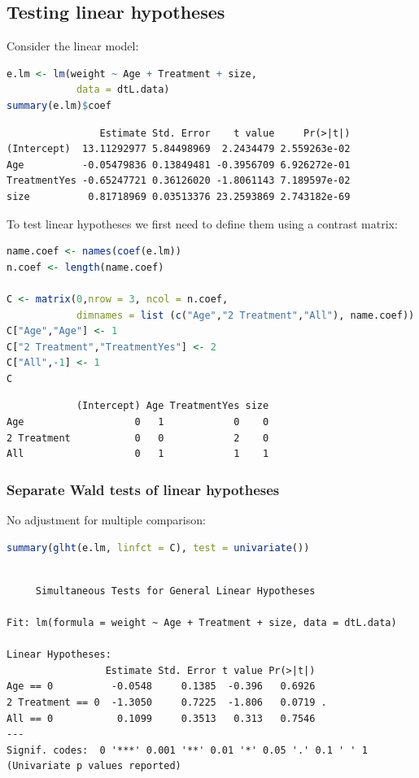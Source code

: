 \documentclass{article}
\begin{document}
\subsection{Testing linear hypotheses}
\label{sec:org1c1d007}

Consider the linear model:
\begin{lstlisting}[language=r,numbers=none]
e.lm <- lm(weight ~ Age + Treatment + size,
            data = dtL.data)
summary(e.lm)$coef
\end{lstlisting}

\label{}
\begin{verbatim}
                Estimate Std. Error    t value     Pr(>|t|)
(Intercept)  13.11292977 5.84498969  2.2434479 2.559263e-02
Age          -0.05479836 0.13849481 -0.3956709 6.926272e-01
TreatmentYes -0.65247721 0.36126020 -1.8061143 7.189597e-02
size          0.81718969 0.03513376 23.2593869 2.743182e-69
\end{verbatim}


To test linear hypotheses we first need to define them using a contrast matrix:
\begin{lstlisting}[language=r,numbers=none]
name.coef <- names(coef(e.lm))
n.coef <- length(name.coef)

C <- matrix(0,nrow = 3, ncol = n.coef, 
            dimnames = list (c("Age","2 Treatment","All"), name.coef))
C["Age","Age"] <- 1
C["2 Treatment","TreatmentYes"] <- 2
C["All",-1] <- 1
C
\end{lstlisting}

\label{}
\begin{verbatim}
            (Intercept) Age TreatmentYes size
Age                   0   1            0    0
2 Treatment           0   0            2    0
All                   0   1            1    1
\end{verbatim}
\subsubsection{Separate Wald tests of linear hypotheses}
\label{sec:orgf19e1c3}

No adjustment for multiple comparison:
\begin{lstlisting}[language=r,numbers=none]
summary(glht(e.lm, linfct = C), test = univariate())
\end{lstlisting}

\label{}
\begin{verbatim}

	 Simultaneous Tests for General Linear Hypotheses

Fit: lm(formula = weight ~ Age + Treatment + size, data = dtL.data)

Linear Hypotheses:
                 Estimate Std. Error t value Pr(>|t|)  
Age == 0          -0.0548     0.1385  -0.396   0.6926  
2 Treatment == 0  -1.3050     0.7225  -1.806   0.0719 .
All == 0           0.1099     0.3513   0.313   0.7546  
---
Signif. codes:  0 '***' 0.001 '**' 0.01 '*' 0.05 '.' 0.1 ' ' 1
(Univariate p values reported)
\end{verbatim}
\end{document}
